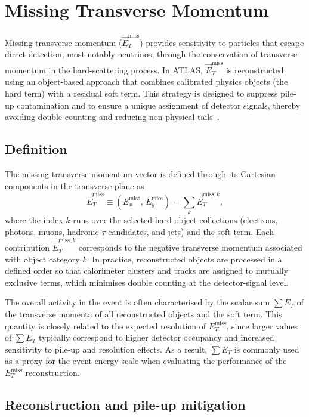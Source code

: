 \section{Missing Transverse Momentum}

Missing transverse momentum ($\vec{E}^{\mathrm{miss}}_T$) provides sensitivity to
particles that escape direct detection, most notably neutrinos, through the
conservation of transverse momentum in the hard-scattering process.
In ATLAS, $\vec{E}^{\mathrm{miss}}_T$ is reconstructed using an object-based
approach that combines calibrated physics objects (the hard term) with a
residual soft term.
This strategy is designed to suppress pile-up contamination and to ensure a
unique assignment of detector signals, thereby avoiding double counting and
reducing non-physical tails~\cite{ATLASCONF2018023}.

\subsection{Definition}

The missing transverse momentum vector is defined through its Cartesian
components in the transverse plane as
\begin{equation}
\vec{E}^{\mathrm{miss}}_T \equiv
(E^{\mathrm{miss}}_x,\,E^{\mathrm{miss}}_y)
= \sum_k \vec{E}^{\mathrm{miss},k}_T ,
\end{equation}
where the index $k$ runs over the selected hard-object collections
(electrons, photons, muons, hadronic $\tau$ candidates, and jets) and the soft
term.
Each contribution $\vec{E}^{\mathrm{miss},k}_T$ corresponds to the negative
transverse momentum associated with object category $k$.
In practice, reconstructed objects are processed in a defined order so that
calorimeter clusters and tracks are assigned to mutually exclusive terms, which
minimises double counting at the detector-signal level.

The overall activity in the event is often characterised by the scalar sum
$\sum E_T$ of the transverse momenta of all reconstructed objects and the soft
term.
This quantity is closely related to the expected resolution of
$E^{\mathrm{miss}}_T$, since larger values of $\sum E_T$ typically correspond to
higher detector occupancy and increased sensitivity to pile-up and resolution
effects.
As a result, $\sum E_T$ is commonly used as a proxy for the event energy scale
when evaluating the performance of the $E^{\mathrm{miss}}_T$ reconstruction.

\subsection{Reconstruction and pile-up mitigation}

